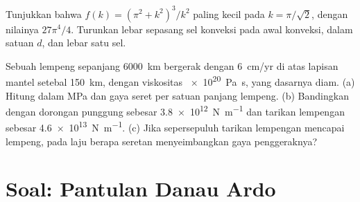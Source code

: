\begin{exercise}[$\star\star\star$]\label{exo:b3:mantle-convection:11}
Tunjukkan bahwa $f(k) = (\pi^2 + k^2)^3/k^2$ paling kecil pada $k = \pi/\sqrt2$, dengan
nilainya $27\pi^4/4$. Turunkan lebar sepasang sel konveksi pada awal
konveksi, dalam satuan $d$, dan lebar satu sel.
\end{exercise}

\begin{exercise}[$\star\star\star$]\label{exo:b3:mantle-convection:12}
Sebuah lempeng sepanjang \qty{6000}{km} bergerak dengan \qty{6}{cm/yr} di atas lapisan mantel
setebal \qty{150}{km}, dengan viskositas \qty{e20}{Pa.s}, yang dasarnya diam. (a)
Hitung  dalam \unit{MPa} dan gaya seret per satuan panjang lempeng.
(b) Bandingkan dengan dorongan punggung sebesar \qty{3.8e12}{N.m^{-1}} dan tarikan lempengan sebesar
\qty{4.6e13}{N.m^{-1}}. (c) Jika sepersepuluh tarikan lempengan mencapai lempeng,
pada laju berapa seretan menyeimbangkan gaya penggeraknya?
\end{exercise}

\section{Soal: Pantulan Danau Ardo}

